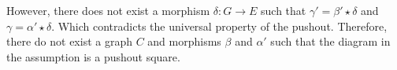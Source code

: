 \begin{center}
{
        }
    \end{center} 
    However, there does not exist a morphism \(\delta : G \to E\) such that \( \gamma' = \beta' \star \delta \) and \( \gamma = \alpha' \star \delta \). Which contradicts the universal property of the pushout. Therefore, there do not exist a graph \( C \) and morphisms \( \beta \) and \( \alpha' \) such that the diagram in the assumption is a pushout square.
